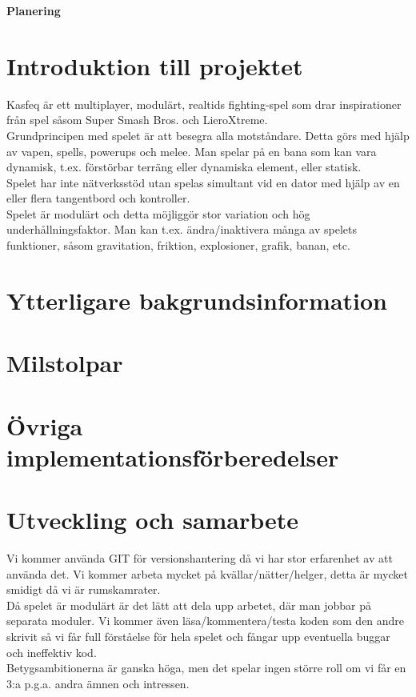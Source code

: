 \begin{center}
   \textbf{\Huge Planering}\\[1cm]
\end{center}
\section{Introduktion till projektet}
Kasfeq är ett multiplayer, modulärt, realtids fighting-spel som drar inspirationer från spel såsom Super Smash Bros. och LieroXtreme.\\
Grundprincipen med spelet är att besegra alla motståndare. Detta görs med hjälp av vapen, spells, powerups och melee. Man spelar på en bana som kan vara dynamisk, t.ex. förstörbar terräng eller dynamiska element, eller statisk.\\
\vspace{11pt}
Spelet har inte nätverksstöd utan spelas simultant vid en dator med hjälp av en eller flera tangentbord och kontroller.\\
\vspace{11pt}
Spelet är modulärt och detta möjliggör stor variation och hög underhållningsfaktor. Man kan t.ex. ändra/inaktivera många av spelets funktioner, såsom gravitation, friktion, explosioner, grafik, banan, etc.\\

\section{Ytterligare bakgrundsinformation}
\section{Milstolpar}
\section{Övriga implementationsförberedelser}
\section{Utveckling och samarbete}
Vi kommer använda GIT för versionshantering då vi har stor erfarenhet av att använda det. Vi kommer arbeta mycket på kvällar/nätter/helger, detta är mycket smidigt då vi är rumskamrater.\\
\vspace{11pt}
Då spelet är modulärt är det lätt att dela upp arbetet, där man jobbar på separata moduler. Vi kommer även läsa/kommentera/testa koden som den andre skrivit så vi får full förståelse för hela spelet och fångar upp eventuella buggar och ineffektiv kod.\\
\vspace{11pt}
Betygsambitionerna är ganska höga, men det spelar ingen större roll om vi får en 3:a p.g.a. andra ämnen och intressen.\\
